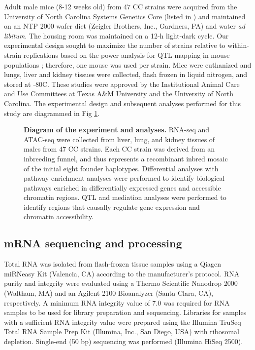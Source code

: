 \documentclass[10pt,letterpaper]{article}
\begin{document}
Adult male mice (8-12 weeks old) from 47 CC strains were acquired from the University of North Carolina Systems Genetics Core (listed in ) and maintained on an NTP 2000 wafer diet (Zeigler Brothers, Inc., Gardners, PA) and water \textit{ad libitum}. The housing room was maintained on a 12-h light-dark cycle. Our experimental design sought to maximize the number of strains relative to within-strain replications based on the power analysis for QTL mapping in mouse populations \cite{Kaeppler1997}; therefore, one mouse was used per strain. Mice were euthanized and lungs, liver and kidney tissues were collected, flash frozen in liquid nitrogen, and stored at -80\degree C. These studies were approved by the Institutional Animal Care and Use Committees at Texas A\&M University and the University of North Carolina. The experimental design and subsequent analyses performed for this study are diagrammed in Fig \ref{fig:overview}.

\begin{figure}[!h]
\caption{{\bf Diagram of the experiment and analyses.}
RNA-seq and ATAC-seq were collected from liver, lung, and kidney tissues of males from 47 CC strains. Each CC strain was derived from an inbreeding funnel, and thus represents a recombinant inbred mosaic of the initial eight founder haplotypes. Differential analyses with pathway enrichment analyses were performed to identify biological pathways enriched in differentially expressed genes and accessible chromatin regions. QTL and mediation analyses were performed to identify regions that causally regulate gene expression and chromatin accessibility.}\label{fig:overview}
\end{figure}

\subsection*{mRNA sequencing and processing}

Total RNA was isolated from flash-frozen tissue samples using a Qiagen miRNeasy Kit (Valencia, CA) according to the manufacturer’s protocol. RNA purity and integrity were evaluated using a Thermo Scientific Nanodrop 2000 (Waltham, MA) and an Agilent 2100 Bioanalyzer (Santa Clara, CA), respectively. A minimum RNA integrity value of 7.0 was required for RNA samples to be used for library preparation and sequencing. Libraries for samples with a sufficient RNA integrity value were prepared using the Illumina TruSeq Total RNA Sample Prep Kit (Illumina, Inc., San Diego, USA) with ribosomal depletion. Single-end (50 bp) sequencing was performed (Illumina HiSeq 2500).
\end{document}
